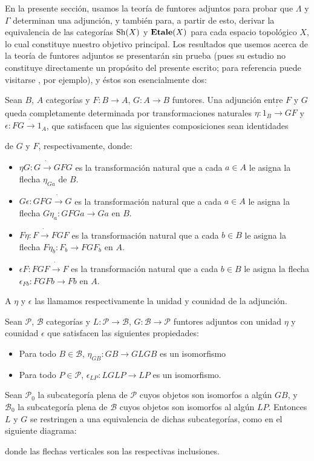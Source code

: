 En la presente sección, usamos la teoría de funtores adjuntos para probar que $\Lambda$ y $\Gamma$ determinan una adjunción, y también para, a partir de esto, derivar la equivalencia de las categorías $\normalfont{\text{Sh}}(X)$ y $\normalfont{\textbf{Etale}}(X)$ para cada espacio topológico $X$, lo cual constituye nuestro objetivo principal. Los resultados que usemos acerca de la teoría de funtores adjuntos se presentarán sin prueba (pues su estudio no constituye directamente un propósito del presente escrito; para referencia puede visitarse \cite[Chapter~4]{CWM}, por ejemplo), y éstos son esencialmente dos:
\begin{Tma}\label{Tma:TmaAdjuntos1}
   Sean $B$, $A$ categorías y $F:B\to A$, $G:A\to B$ funtores. Una adjunción entre $F$ y $G$ queda completamente determinada por transformaciones naturales $\eta:1_{B}\dot{\to}GF$ y $\epsilon:FG\dot{\to}1_{A}$, que satisfacen que las siguientes composiciones sean identidades
   
   de $G$ y $F$, respectivamente, donde: 
   \begin{itemize}
      \item $\eta G:G\dot{\to}GFG$ es la transformación natural que a cada $a\in A$ le asigna la flecha $\eta_{G a}$ de $B$.
      \item $G\epsilon :GFG\dot{\to}G$ es la transformación natural que a cada $a\in A$ le asigna la flecha $G\eta_{a}:GFGa\to Ga$ en $B$.
      \item $F \eta: F\dot{\to}FGF$ es la transformación natural que a cada $b\in B$ le asigna la flecha $F\eta_{b}:F_{b}\to FGF_{b}$ en $A$.
      \item $\epsilon F:FGF\dot{\to}F$ es la transformación natural que a cada $b\in B$ le asigna la flecha $\epsilon_{Fb}:FGFb\to Fb$ en $A$. 
   \end{itemize}
   A $\eta$ y $\epsilon$ las llamamos respectivamente la unidad y counidad de la adjunción.
\end{Tma}
\begin{Lema}\label{Lema:LemaAdjuntos}
   Sean $\mathcal{P}$, $\mathcal{B}$ categorías y $L:\mathcal{P}\to \mathcal{B}$, $G:\mathcal{B}\to \mathcal{P}$ funtores adjuntos con unidad $\eta$ y counidad $\epsilon$ que satisfacen las siguientes propiedades:
   \begin{itemize}
      \item[\textbf{\text{(L1)}}] Para todo $B\in \mathcal{B}$, $\eta_{GB}:GB\to GLGB$ es un isomorfismo
      \item[\textbf{\text{(L2)}}] Para todo $P\in \mathcal{P}$, $\epsilon_{LP}:LGLP\to LP$ es un isomorfismo.
   \end{itemize}
   Sean $\mathcal{P}_{0}$ la subcategoría plena de $\mathcal{P}$ cuyos objetos son isomorfos a algún $GB$, y $\mathcal{B}_{0}$ la subcategoría plena de $\mathcal{B}$ cuyos objetos son isomorfos al algún $LP$. Entonces $L$ y $G$ se restringen a una equivalencia de dichas subcategorías, como en el siguiente diagrama:
   
   donde las flechas verticales son las respectivas inclusiones.
\end{Lema}
